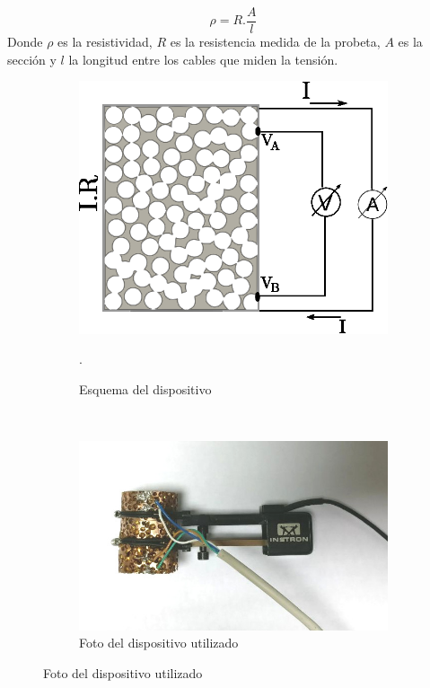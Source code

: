 \documentclass[a4paper,12pt,fleqn,twoside,openany]{book}
\begin{document}
\begin{equation}
 \rho = R . \frac{A}{l} \label{resist} 
\end{equation}
Donde $\rho$ es la resistividad, $R$ es la resistencia medida de la probeta, $A$ es la sección y $l$ la longitud entre los cables que miden la tensión.

 
 
 \begin{figure}
    \centering
    \begin{subfigure}{0.4\textwidth}
        \includegraphics[width=\textwidth]{Img/Procedimiento/CuatroPuntas1.eps}
	\caption{Esquema del dispositivo}. 
	\label{fig:CuatroPuntas}
    \end{subfigure}
    ~ %
    \begin{subfigure}{0.4\textwidth}
        \includegraphics[width=\textwidth]{Img/Procedimiento/cpfoto.jpg}
        \caption{Foto del dispositivo utilizado}
        \label{fig:cuatropuntasyextensometro}
    \end{subfigure}
\end{figure}
\end{document}
